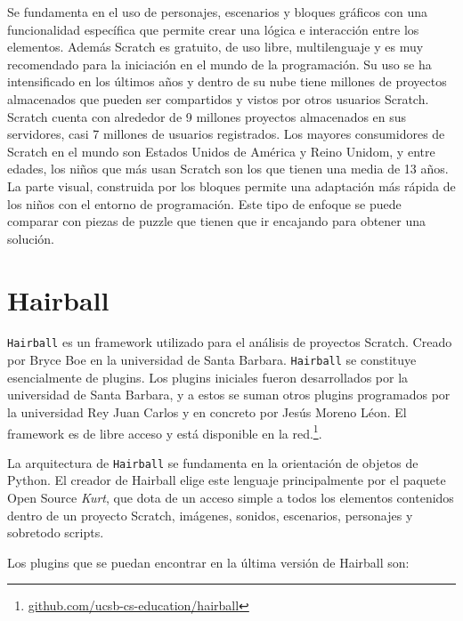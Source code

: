 \documentclass[a4paper, 12pt]{book}
\begin{document}
Se fundamenta en el uso de personajes, escenarios y bloques gráficos con una funcionalidad
específica que permite crear una lógica e interacción entre los elementos. 
Además Scratch es gratuito, de uso libre, multilenguaje y es muy recomendado para la
iniciación en el mundo de la programación. Su uso se ha intensificado en los últimos años 
y dentro de su nube tiene millones de proyectos almacenados que pueden ser compartidos y 
vistos por otros usuarios Scratch. \\

Scratch cuenta con alrededor de 9 millones proyectos almacenados en sus servidores, casi
7 millones de usuarios registrados. Los mayores consumidores de Scratch en el mundo son 
Estados Unidos de América y Reino Unidom, y entre edades, los niños que más usan Scratch
son los que tienen una media de 13 años.  \\

La parte visual, construida por los bloques permite una adaptación más rápida de los niños
con el entorno de programación. Este tipo de enfoque se puede comparar con piezas de puzzle
que tienen que ir encajando para obtener una solución. 


\section{Hairball}
\label{sec:seccion3}
\texttt{Hairball} es un framework utilizado para el análisis de proyectos Scratch. Creado 
por Bryce Boe en la universidad de Santa Barbara. \texttt{Hairball} se constituye esencialmente de 
plugins. Los plugins iniciales fueron desarrollados por la universidad de Santa Barbara, y
a estos se suman otros plugins programados por la universidad Rey Juan Carlos y en concreto
por Jesús Moreno Léon. El framework es de libre acceso y está disponible en la 
red.\footnote{\url{github.com/ucsb-cs-education/hairball}}.

La arquitectura de \texttt{Hairball} se fundamenta en la orientación de objetos de Python. El
creador de Hairball elige este lenguaje principalmente por el paquete Open Source \emph{Kurt}, 
que dota de un acceso simple a todos los elementos contenidos dentro de un proyecto Scratch, 
imágenes, sonidos, escenarios, personajes y sobretodo scripts. 

Los plugins que se puedan encontrar en la última versión de Hairball son:
\end{document}
